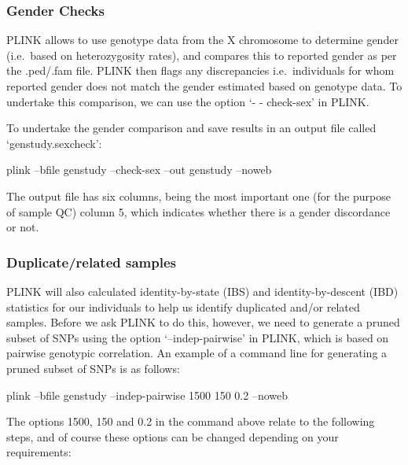 \documentclass[]{book}
\newenvironment{Shaded}{\begin{snugshade}}{\end{snugshade}}
\newcommand{\ExtensionTok}[1]{#1}
\newcommand{\NormalTok}[1]{#1}
\begin{document}
\subsubsection{Gender Checks}\label{gender-checks}

PLINK allows to use genotype data from the X chromosome to determine
gender (i.e.~based on heterozygosity rates), and compares this to
reported gender as per the .ped/.fam file. PLINK then flags any
discrepancies i.e.~individuals for whom reported gender does not match
the gender estimated based on genotype data. To undertake this
comparison, we can use the option `- - check-sex' in PLINK.

To undertake the gender comparison and save results in an output file
called `genstudy.sexcheck':

\begin{Shaded}
\begin{Highlighting}[]
\ExtensionTok{plink}\NormalTok{ --bfile genstudy --check-sex --out genstudy --noweb}
\end{Highlighting}
\end{Shaded}

The output file has six columns, being the most important one (for the
purpose of sample QC) column 5, which indicates whether there is a
gender discordance or not.

\subsubsection{Duplicate/related
samples}\label{duplicaterelated-samples}

PLINK will also calculated identity-by-state (IBS) and
identity-by-descent (IBD) statistics for our individuals to help us
identify duplicated and/or related samples. Before we ask PLINK to do
this, however, we need to generate a pruned subset of SNPs using the
option `--indep-pairwise' in PLINK, which is based on pairwise genotypic
correlation. An example of a command line for generating a pruned subset
of SNPs is as follows:

\begin{Shaded}
\begin{Highlighting}[]
\ExtensionTok{plink}\NormalTok{ --bfile genstudy --indep-pairwise 1500 150 0.2 --noweb}
\end{Highlighting}
\end{Shaded}

The options 1500, 150 and 0.2 in the command above relate to the
following steps, and of course these options can be changed depending on
your requirements:
\end{document}
